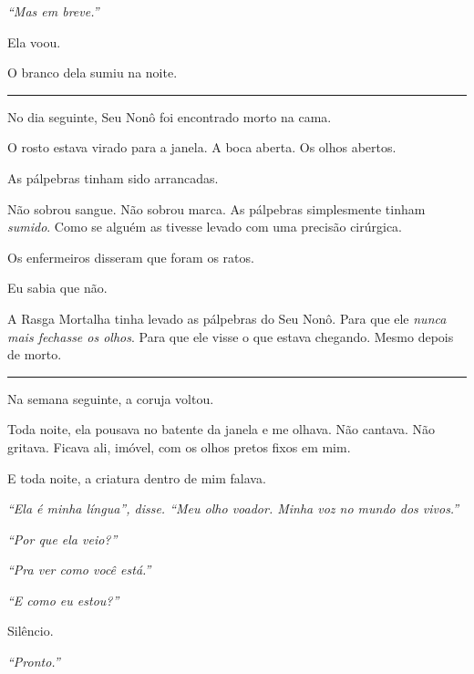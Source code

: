 \noindent \textit{\textquotedblleft{}Mas em breve.\textquotedblright{}}

\noindent Ela voou.

\noindent O branco dela sumiu na noite.

\vspace{0.5em}\noindent\rule{\textwidth}{0.5pt}\vspace{0.5em}

\noindent No dia seguinte, Seu Nonô foi encontrado morto na cama.

\noindent O rosto estava virado para a janela.
A boca aberta.
Os olhos abertos.

\noindent As pálpebras tinham sido arrancadas.

\noindent Não sobrou sangue. Não sobrou marca. As pálpebras simplesmente tinham \textit{sumido}. Como se alguém as tivesse levado com uma precisão cirúrgica.

\noindent Os enfermeiros disseram que foram os ratos.

\noindent Eu sabia que não.

\noindent A Rasga Mortalha tinha levado as pálpebras do Seu Nonô.
Para que ele \textit{nunca mais fechasse os olhos}.
Para que ele visse o que estava chegando.
Mesmo depois de morto.

\vspace{0.5em}\noindent\rule{\textwidth}{0.5pt}\vspace{0.5em}

\noindent Na semana seguinte, a coruja voltou.

\noindent Toda noite, ela pousava no batente da janela e me olhava. Não cantava. Não gritava. Ficava ali, imóvel, com os olhos pretos fixos em mim.

\noindent E toda noite, a criatura dentro de mim falava.

\noindent \textit{\textquotedblleft{}Ela é minha língua\textquotedblright{}\textit{, disse. }\textquotedblleft{}Meu olho voador. Minha voz no mundo dos vivos.\textquotedblright{}}

\noindent \textit{\textquotedblleft{}Por que ela veio?\textquotedblright{}}

\noindent \textit{\textquotedblleft{}Pra ver como você está.\textquotedblright{}}

\noindent \textit{\textquotedblleft{}E como eu estou?\textquotedblright{}}

\noindent Silêncio.

\noindent \textit{\textquotedblleft{}Pronto.\textquotedblright{}}

